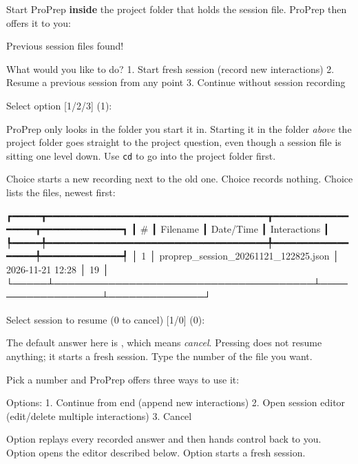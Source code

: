 Start ProPrep \textbf{inside} the project folder that holds the session file.
ProPrep then offers it to you:

\begin{screen}
Previous session files found!

What would you like to do?
  1. Start fresh session (record new interactions)
  2. Resume a previous session from any point
  3. Continue without session recording

Select option  [1/2/3] (1):
\end{screen}

\begin{watchout}
ProPrep only looks in the folder you start it in. Starting it in the folder
\emph{above} the project folder goes straight to the project question, even
though a session file is sitting one level down. Use \texttt{cd} to go into
the project folder first.
\end{watchout}

Choice  starts a new recording next to the old one. Choice 
records nothing. Choice  lists the files, newest first:

\begin{screen}
┏━━━━━┳━━━━━━━━━━━━━━━━━━━━━━━━━━━━━━━━━━━━━━┳━━━━━━━━━━━━━━━━━━┳━━━━━━━━━━━━━━┓
┃ #   ┃ Filename                             ┃ Date/Time        ┃ Interactions ┃
┡━━━━━╇━━━━━━━━━━━━━━━━━━━━━━━━━━━━━━━━━━━━━━╇━━━━━━━━━━━━━━━━━━╇━━━━━━━━━━━━━━┩
│ 1   │ proprep_session_20261121_122825.json │ 2026-11-21 12:28 │ 19           │
└─────┴──────────────────────────────────────┴──────────────────┴──────────────┘

Select session to resume (0 to cancel)  [1/0] (0):
\end{screen}

\begin{watchout}
The default answer here is , which means \emph{cancel}. Pressing
 does not resume anything; it starts a fresh session. Type the
number of the file you want.
\end{watchout}

Pick a number and ProPrep offers three ways to use it:

\begin{screen}
Options:
  1. Continue from end (append new interactions)
  2. Open session editor (edit/delete multiple interactions)
  3. Cancel
\end{screen}

Option  replays every recorded answer and then hands control back to
you. Option  opens the editor described below. Option  starts a
fresh session.


